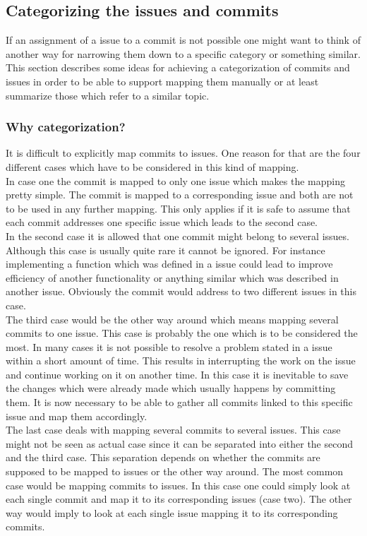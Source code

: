 \subsection{Categorizing the issues and commits}

If an assignment of a issue to a commit is not possible one might want to think of another way for narrowing them down to a specific category or something similar.
This section describes some ideas for achieving a categorization of commits and issues in order to be able to support mapping them manually or at least summarize those which refer to a similar topic.

\subsubsection{Why categorization?}

It is difficult to explicitly map commits to issues.
One reason for that are the four different cases which have to be considered in this kind of mapping.\\

In case one the commit is mapped to only one issue which makes the mapping pretty simple.
The commit is mapped to a corresponding issue and both are not to be used in any further mapping.
This only applies if it is safe to assume that each commit addresses one specific issue which leads to the second case.\\

In the second case it is allowed that one commit might belong to several issues.
Although this case is usually quite rare it cannot be ignored.
For instance implementing a function which was defined in a issue could lead to improve efficiency of another functionality or anything similar which was described in another issue.
Obviously the commit would address to two different issues in this case.\\

The third case would be the other way around which means mapping several commits to one issue.
This case is probably the one which is to be considered the most.
In many cases it is not possible to resolve a problem stated in a issue within a short amount of time.
This results in interrupting the work on the issue and continue working on it on another time.
In this case it is inevitable to save the changes which were already made which usually happens by committing them.
It is now necessary to be able to gather all commits linked to this specific issue and map them accordingly.\\
\newpage
The last case deals with mapping several commits to several issues.
This case might not be seen as actual case since it can be separated into either the second and the third case.
This separation depends on whether the commits are supposed to be mapped to issues or the other way around.
The most common case would be mapping commits to issues.
In this case one could simply look at each single commit and map it to its corresponding issues (case two).
The other way would imply to look at each single issue mapping it to its corresponding commits.\\

